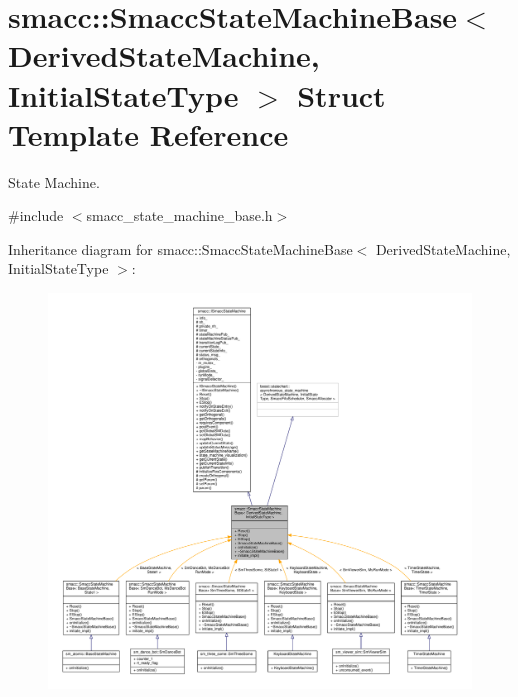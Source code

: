 \hypertarget{structsmacc_1_1SmaccStateMachineBase}{}\section{smacc\+:\+:Smacc\+State\+Machine\+Base$<$ Derived\+State\+Machine, Initial\+State\+Type $>$ Struct Template Reference}
\label{structsmacc_1_1SmaccStateMachineBase}


State Machine.  




{\ttfamily \#include $<$smacc\+\_\+state\+\_\+machine\+\_\+base.\+h$>$}



Inheritance diagram for smacc\+:\+:Smacc\+State\+Machine\+Base$<$ Derived\+State\+Machine, Initial\+State\+Type $>$\+:
\nopagebreak
\begin{figure}[H]
\begin{center}
\leavevmode
\includegraphics[width=350pt]{structsmacc_1_1SmaccStateMachineBase__inherit__graph}
\end{center}
\end{figure}


